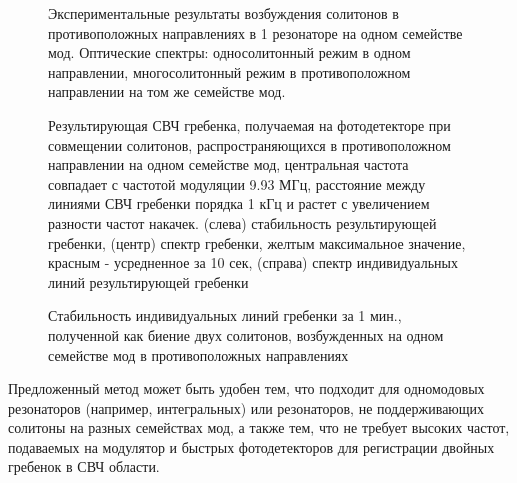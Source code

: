 \begin{figure}[!htb]
\begin{minipage}{1\linewidth}
\end{minipage}
\caption{Экспериментальные результаты возбуждения солитонов в противоположных направлениях в 1 резонаторе на одном семействе мод. Оптические спектры: односолитонный режим в одном направлении, многосолитонный режим в противоположном направлении на том же семействе мод.}
\label{cp_one_family}
\end{figure}

\begin{figure}[!htb]
\begin{minipage}{1\linewidth}
\end{minipage}
\caption{Результирующая СВЧ гребенка, получаемая на фотодетекторе при совмещении солитонов, распространяющихся в противоположном направлении на одном семействе мод, центральная частота совпадает с частотой модуляции 9.93 МГц, расстояние между линиями СВЧ гребенки порядка 1 кГц и растет с увеличением разности частот накачек. (слева) стабильность результирующей гребенки, (центр) спектр гребенки, желтым максимальное значение, красным - усредненное за 10 сек, (справа) спектр индивидуальных линий результирующей гребенки}
\label{cp_one_family_dual_comb}
\end{figure}

\begin{figure}[!htb]
\begin{minipage}{1\linewidth}
\end{minipage}
\caption{Стабильность индивидуальных линий гребенки за 1 мин., полученной как биение двух солитонов, возбужденных на одном семействе мод в противоположных направлениях}
\label{cp_one_family_stability}
\end{figure}

Предложенный метод может быть удобен тем, что подходит для одномодовых резонаторов (например, интегральных) или резонаторов, не поддерживающих солитоны на разных семействах мод, а также тем, что не требует высоких частот, подаваемых на модулятор и быстрых фотодетекторов для регистрации двойных гребенок в СВЧ области.

